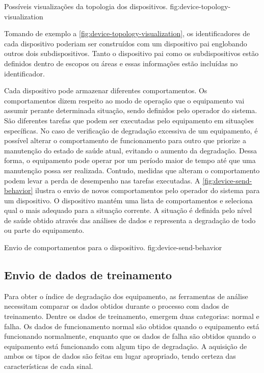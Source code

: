   {Possíveis visualizações da topologia dos dispositivos.}
  {fig:device-topology-visualization}

Tomando de exemplo a \cref{fig:device-topology-visualization}, os identificadores de cada
dispositivo poderiam ser construídos com um dispositivo pai englobando outros dois subdispositivos.
Tanto o dispositivo pai como os subdispositivos estão definidos dentro de escopos ou áreas e essas
informações estão incluídas no identificador.


Cada dispositivo pode armazenar diferentes comportamentos. Os comportamentos dizem respeito ao modo
de operação que o equipamento vai assumir perante determinada situação, sendo definidos pelo
operador do sistema. São diferentes tarefas que podem ser executadas pelo equipamento em situações
específicas. No caso de verificação de degradação excessiva de um equipamento, é possível alterar o
comportamento de funcionamento para outro que priorize a manutenção do estado de saúde atual,
evitando o aumento da degradação. Dessa forma, o equipamento pode operar por um período maior de
tempo até que uma manutenção possa ser realizada. Contudo, medidas que alteram o comportamento podem
levar a perda de desempenho nas tarefas executadas. A \cref{fig:device-send-behavior} ilustra o
envio de novos comportamentos pelo operador do sistema para um dispositivo. O dispositivo mantém uma
lista de comportamentos e seleciona qual o mais adequado para a situação corrente. A situação é
definida pelo nível de saúde obtido através das análises de dados e representa a degradação de todo
ou parte do equipamento.

  {Envio de comportamentos para o dispositivo.}
  {fig:device-send-behavior}


\subsection{Envio de dados de treinamento}

Para obter o índice de degradação dos equipamento, as ferramentas de análise necessitam comparar os
dados obtidos durante o processo com dados de treinamento. Dentre os dados de treinamento, emergem
duas categorias: normal e falha. Os dados de funcionamento normal são obtidos quando o equipamento
está funcionando normalmente, enquanto que os dados de falha são obtidos quando o equipamento está
funcionando com algum tipo de degradação. A aquisição de ambos os tipos de dados são feitas em lugar
apropriado, tendo certeza das características de cada sinal.

